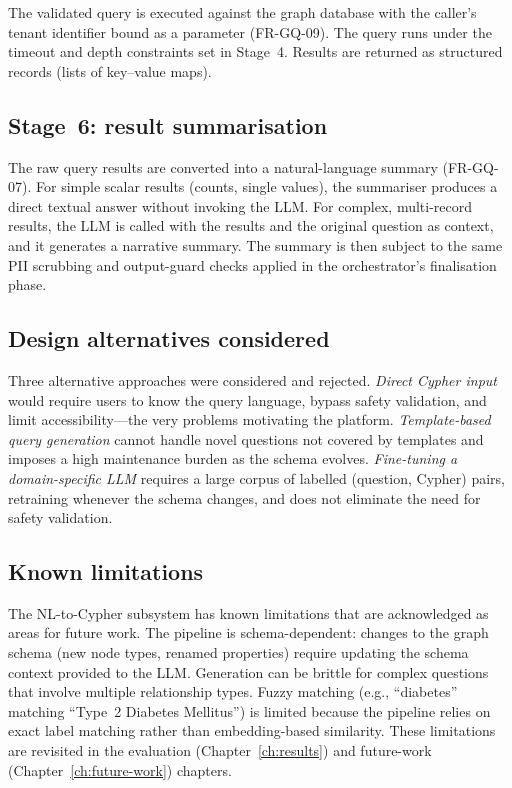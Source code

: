 \documentclass[a4paper,noexaminfo]{sapthesis}
\begin{document}
The validated query is executed against the graph database with the
caller's tenant identifier bound as a parameter (FR-GQ-09).  The query
runs under the timeout and depth constraints set in Stage~4.  Results
are returned as structured records (lists of key--value maps).

\subsection{Stage~6: result summarisation}

The raw query results are converted into a natural-language summary
(FR-GQ-07).  For simple scalar results (counts, single values), the
summariser produces a direct textual answer without invoking the LLM.
For complex, multi-record results, the LLM is called with the results
and the original question as context, and it generates a narrative
summary.  The summary is then subject to the same PII scrubbing and
output-guard checks applied in the orchestrator's finalisation phase.

\subsection{Design alternatives considered}

Three alternative approaches were considered and rejected.  \emph{Direct
Cypher input} would require users to know the query language, bypass
safety validation, and limit accessibility---the very problems motivating
the platform.  \emph{Template-based query generation} cannot handle novel
questions not covered by templates and imposes a high maintenance burden as
the schema evolves.  \emph{Fine-tuning a domain-specific LLM} requires a
large corpus of labelled (question, Cypher) pairs, retraining whenever the
schema changes, and does not eliminate the need for safety validation.

\subsection{Known limitations}

The NL-to-Cypher subsystem has known limitations that are acknowledged as
areas for future work.  The pipeline is schema-dependent: changes to the
graph schema (new node types, renamed properties) require updating the
schema context provided to the LLM.  Generation can be brittle for complex
questions that involve multiple relationship types.  Fuzzy matching (e.g.,
``diabetes'' matching ``Type~2 Diabetes Mellitus'') is limited because the
pipeline relies on exact label matching rather than embedding-based
similarity.  These limitations are revisited in the evaluation
(Chapter~\ref{ch:results}) and future-work (Chapter~\ref{ch:future-work})
chapters.
\end{document}
